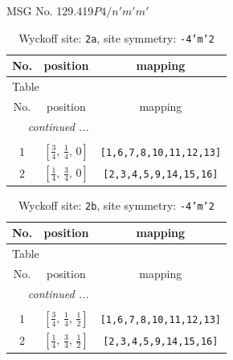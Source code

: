 \documentclass[fleqn,8pt]{jsarticle}
\begin{document}
\setcounter{MaxMatrixCols}{32}

\renewcommand{\tablename}{Table~}
\renewcommand{\figurename}{Figure~}
\begin{center}
\LARGE
MSG No. 129.419\quad$P4/n'm'm'$
\end{center}
\renewcommand{\arraystretch}{1.2}
\begin{longtable}{ccc}
\caption{Wyckoff site: {\tt 2a}, site symmetry: {\tt -4'm'2}}
 \\
 \hline \hline
No. & position & mapping \\ \hline \endfirsthead

\multicolumn{2}{l}{\tablename\ \thetable{}} \\
 \hline \hline
No. & position & mapping \\ \hline \endhead

 \hline \hline
\multicolumn{2}{r}{\footnotesize\it continued ...} \\ \endfoot

 \hline \hline
\multicolumn{2}{r}{} \\ \endlastfoot

1 & $\left[ \frac{3}{4},\, \frac{1}{4},\, 0 \right]$ & {\tt [1,6,7,8,10,11,12,13]} \\ \hline
2 & $\left[ \frac{1}{4},\, \frac{3}{4},\, 0 \right]$ & {\tt [2,3,4,5,9,14,15,16]} \\
\end{longtable}
\renewcommand{\arraystretch}{1.2}
\begin{longtable}{ccc}
\caption{Wyckoff site: {\tt 2b}, site symmetry: {\tt -4'm'2}}
 \\
 \hline \hline
No. & position & mapping \\ \hline \endfirsthead

\multicolumn{2}{l}{\tablename\ \thetable{}} \\
 \hline \hline
No. & position & mapping \\ \hline \endhead

 \hline \hline
\multicolumn{2}{r}{\footnotesize\it continued ...} \\ \endfoot

 \hline \hline
\multicolumn{2}{r}{} \\ \endlastfoot

1 & $\left[ \frac{3}{4},\, \frac{1}{4},\, \frac{1}{2} \right]$ & {\tt [1,6,7,8,10,11,12,13]} \\ \hline
2 & $\left[ \frac{1}{4},\, \frac{3}{4},\, \frac{1}{2} \right]$ & {\tt [2,3,4,5,9,14,15,16]} \\
\end{longtable}
\end{document}

